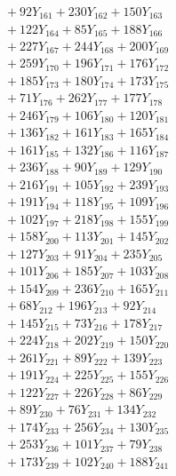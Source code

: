 \documentclass[a4paper,10pt]{article}
\begin{document}
{\begin{align}
&\;  + 92 Y_{161} + 230 Y_{162} + 150 Y_{163} \\[0.3ex]
&\;  + 122 Y_{164} + 85 Y_{165} + 188 Y_{166} \\[0.3ex]
&\;  + 227 Y_{167} + 244 Y_{168} + 200 Y_{169} \\[0.3ex]
&\;  + 259 Y_{170} + 196 Y_{171} + 176 Y_{172} \\[0.3ex]
&\;  + 185 Y_{173} + 180 Y_{174} + 173 Y_{175} \\[0.3ex]
&\;  + 71 Y_{176} + 262 Y_{177} + 177 Y_{178} \\[0.5ex]\allowbreak
&\;  + 246 Y_{179} + 106 Y_{180} + 120 Y_{181} \\[0.3ex]
&\;  + 136 Y_{182} + 161 Y_{183} + 165 Y_{184} \\[0.3ex]
&\;  + 161 Y_{185} + 132 Y_{186} + 116 Y_{187} \\[0.3ex]
&\;  + 236 Y_{188} + 90 Y_{189} + 129 Y_{190} \\[0.3ex]
&\;  + 216 Y_{191} + 105 Y_{192} + 239 Y_{193} \\[0.3ex]
&\;  + 191 Y_{194} + 118 Y_{195} + 109 Y_{196} \\[0.3ex]
&\;  + 102 Y_{197} + 218 Y_{198} + 155 Y_{199} \\[0.3ex]
&\;  + 158 Y_{200} + 113 Y_{201} + 145 Y_{202} \\[0.3ex]
&\;  + 127 Y_{203} + 91 Y_{204} + 235 Y_{205} \\[0.3ex]
&\;  + 101 Y_{206} + 185 Y_{207} + 103 Y_{208} \\[0.5ex]\allowbreak
&\;  + 154 Y_{209} + 236 Y_{210} + 165 Y_{211} \\[0.3ex]
&\;  + 68 Y_{212} + 196 Y_{213} + 92 Y_{214} \\[0.3ex]
&\;  + 145 Y_{215} + 73 Y_{216} + 178 Y_{217} \\[0.3ex]
&\;  + 224 Y_{218} + 202 Y_{219} + 150 Y_{220} \\[0.3ex]
&\;  + 261 Y_{221} + 89 Y_{222} + 139 Y_{223} \\[0.3ex]
&\;  + 191 Y_{224} + 225 Y_{225} + 155 Y_{226} \\[0.3ex]
&\;  + 122 Y_{227} + 226 Y_{228} + 86 Y_{229} \\[0.3ex]
&\;  + 89 Y_{230} + 76 Y_{231} + 134 Y_{232} \\[0.3ex]
&\;  + 174 Y_{233} + 256 Y_{234} + 130 Y_{235} \\[0.3ex]
&\;  + 253 Y_{236} + 101 Y_{237} + 79 Y_{238} \\[0.5ex]\allowbreak
&\;  + 173 Y_{239} + 102 Y_{240} + 188 Y_{241} \\[0.3ex]

\end{align}}
\end{document}
